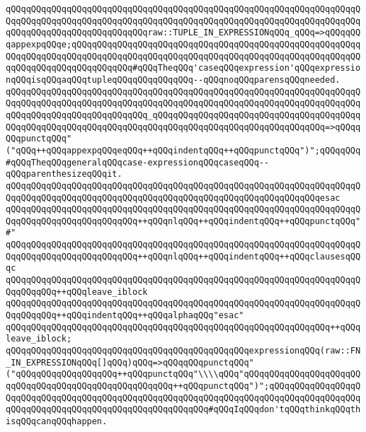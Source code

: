 \verb|qQQqqQQqqQQqqQQqqQQqqQQqqQQqqQQqqQQqqQQqqQQqqQQqqQQqqQQqqQQqqQQqqQQqqQQqqQQqqQQqqQQqqQQqqQQqqQQqqQQqqQQqqQQqqQQqqQQqqQQqqQQqqQQqqQQqqQQqqQQqqQQqqQQqqQQqqQQqqQQqqQQqqQQqraw::TUPLE_IN_EXPRESSIONqQQq_qQQq=>qQQqqQQqappexpqQQqe;qQQqqQQqqQQqqQQqqQQqqQQqqQQqqQQqqQQqqQQqqQQqqQQqqQQqqQQqqQQqqQQqqQQqqQQqqQQqqQQqqQQqqQQqqQQqqQQqqQQqqQQqqQQqqQQqqQQqqQQqqQQqqQQqqQQqqQQqqQQqqQQqqQQqqQQq#qQQqTheqQQq'caseqQQqexpression'qQQqexpressionqQQqisqQQqaqQQqtupleqQQqqQQqqQQqqQQq--qQQqnoqQQqparensqQQqneeded.|\newline
\verb|qQQqqQQqqQQqqQQqqQQqqQQqqQQqqQQqqQQqqQQqqQQqqQQqqQQqqQQqqQQqqQQqqQQqqQQqqQQqqQQqqQQqqQQqqQQqqQQqqQQqqQQqqQQqqQQqqQQqqQQqqQQqqQQqqQQqqQQqqQQqqQQqqQQqqQQqqQQqqQQqqQQqqQQq_qQQqqQQqqQQqqQQqqQQqqQQqqQQqqQQqqQQqqQQqqQQqqQQqqQQqqQQqqQQqqQQqqQQqqQQqqQQqqQQqqQQqqQQqqQQqqQQqqQQqqQQq=>qQQqqQQqpunctqQQq"("qQQq++qQQqappexpqQQqeqQQq++qQQqindentqQQq++qQQqpunctqQQq")";qQQqqQQq#qQQqTheqQQqgeneralqQQqcase-expressionqQQqcaseqQQq--qQQqparenthesizeqQQqit.|\newline
\verb|qQQqqQQqqQQqqQQqqQQqqQQqqQQqqQQqqQQqqQQqqQQqqQQqqQQqqQQqqQQqqQQqqQQqqQQqqQQqqQQqqQQqqQQqqQQqqQQqqQQqqQQqqQQqqQQqqQQqqQQqqQQqqQQqqQQqesac|\newline
\verb|qQQqqQQqqQQqqQQqqQQqqQQqqQQqqQQqqQQqqQQqqQQqqQQqqQQqqQQqqQQqqQQqqQQqqQQqqQQqqQQqqQQqqQQqqQQqqQQq++qQQqnlqQQq++qQQqindentqQQq++qQQqpunctqQQq"#"|\newline
\verb|qQQqqQQqqQQqqQQqqQQqqQQqqQQqqQQqqQQqqQQqqQQqqQQqqQQqqQQqqQQqqQQqqQQqqQQqqQQqqQQqqQQqqQQqqQQqqQQq++qQQqnlqQQq++qQQqindentqQQq++qQQqclausesqQQqc|\newline
\verb|qQQqqQQqqQQqqQQqqQQqqQQqqQQqqQQqqQQqqQQqqQQqqQQqqQQqqQQqqQQqqQQqqQQqqQQqqQQqqQQq++qQQqleave_iblock|\newline
\verb|qQQqqQQqqQQqqQQqqQQqqQQqqQQqqQQqqQQqqQQqqQQqqQQqqQQqqQQqqQQqqQQqqQQqqQQqqQQqqQQq++qQQqindentqQQq++qQQqalphaqQQq"esac"|\newline
\verb|qQQqqQQqqQQqqQQqqQQqqQQqqQQqqQQqqQQqqQQqqQQqqQQqqQQqqQQqqQQqqQQq++qQQqleave_iblock;|\newline
\newline
\verb|qQQqqQQqqQQqqQQqqQQqqQQqqQQqqQQqqQQqqQQqqQQqqQQqexpressionqQQq(raw::FN_IN_EXPRESSIONqQQq[]qQQq)qQQq=>qQQqqQQqpunctqQQq"("qQQqqQQqqQQqqQQqqQQq++qQQqpunctqQQq"\\\\qQQq"qQQqqQQqqQQqqQQqqQQqqQQqqQQqqQQqqQQqqQQqqQQqqQQqqQQqqQQq++qQQqpunctqQQq")";qQQqqQQqqQQqqQQqqQQqqQQqqQQqqQQqqQQqqQQqqQQqqQQqqQQqqQQqqQQqqQQqqQQqqQQqqQQqqQQqqQQqqQQqqQQqqQQqqQQqqQQqqQQqqQQqqQQqqQQqqQQqqQQq#qQQqIqQQqdon'tqQQqthinkqQQqthisqQQqcanqQQqhappen.|\newline
